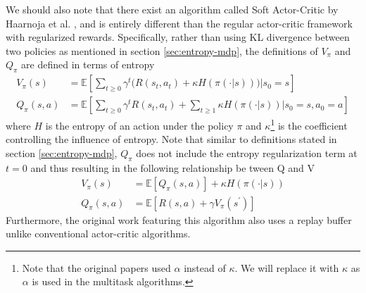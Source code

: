 \documentclass[12pt]{report}
\begin{document}
We should also note that there exist an algorithm called Soft Actor-Critic by Haarnoja et al. \cite{haarnoja2018soft} \cite{haarnoja2018soft1}, and is entirely different than the regular actor-critic framework with regularized rewards. Specifically, rather than using KL divergence between two policies as mentioned in section \ref{sec:entropy-mdp}, the definitions of $V_\pi$ and $Q_\pi$ are defined in terms of entropy
\begin{align}
    V_\pi(s) &= \mathbb{E}\left[\sum_{t\ge 0} \gamma^t\Big(R(s_t,a_t)+\kappa H(\pi(\cdot|s))\Big)\big|s_0 = s\right]\\
    Q_\pi(s,a) &= \mathbb{E}\left[\sum_{t\ge 0} \gamma^t R(s_t,a_t)+ \sum_{t\ge 1}\kappa H(\pi(\cdot|s))\big|s_0 = s, a_0 = a\right]
\end{align}
where $H$ is the entropy of an action under the policy $\pi$ and $\kappa$\footnote{Note that the original papers \cite{haarnoja2018soft} \cite{haarnoja2018soft1} used $\alpha$ instead of $\kappa$. We will replace it with $\kappa$ as $\alpha$ is used in the multitask algorithms.} is the coefficient controlling the influence of entropy. Note that similar to definitions stated in section \ref{sec:entropy-mdp}, $Q_\pi$ does not include the entropy regularization term at $t=0$ and thus resulting in the following relationship be tween Q and V
\begin{align}
    V_\pi(s) &= \mathbb{E}\left[Q_\pi(s,a)\right] + \kappa H(\pi(\cdot|s))\\
    Q_\pi(s,a) &= \mathbb{E}\left[R(s,a)+\gamma V_\pi(s^\prime)\right]
\end{align}
Furthermore, the original work featuring this algorithm also uses a replay buffer unlike conventional actor-critic algorithms.\\
\end{document}
